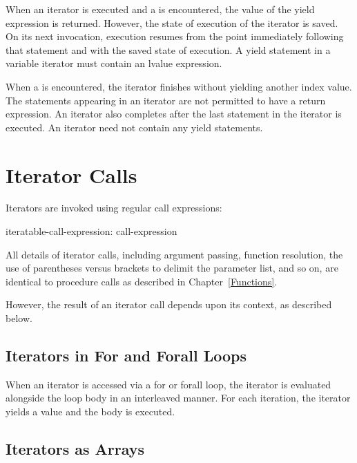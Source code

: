 When an iterator is executed and a  is encountered, the value of the yield
expression is returned.  However, the state of execution of the iterator is
saved.  On its next invocation, execution resumes from the point immediately
following that  statement and with the saved state of execution.
A yield statement in a variable iterator must contain an lvalue expression.

When a  is encountered, the iterator finishes without yielding another
index value.  The  statements appearing in an iterator are not
permitted to have a return expression.
An iterator also completes after the last
statement in the iterator is executed.
An iterator need not contain any yield statements.


\section{Iterator Calls}
\label{Iterator_Calls}

Iterators are invoked using regular call expressions:
\begin{syntax}
iteratable-call-expression:
  call-expression
\end{syntax}

All details of iterator calls, including argument passing, function
resolution, the use of parentheses versus brackets to delimit the parameter
list, and so on,
are identical to procedure calls as described in Chapter~\ref{Functions}.

However, the result of an iterator call depends upon its context, as described below.

\subsection{Iterators in For and Forall Loops}
\label{Iterators_in_For_and_Forall_Loops}

When an iterator is accessed via a for or forall loop, the iterator is
evaluated alongside the loop body in an interleaved manner.  For each
iteration, the iterator yields a value and the body is executed.

\subsection{Iterators as Arrays}
\label{Iterators_as_Arrays}

